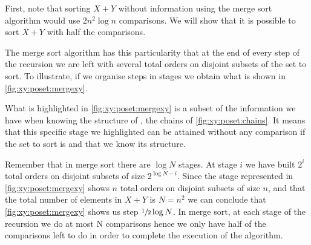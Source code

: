First, note that sorting $X + Y$ without information using the merge sort
algorithm would use $2 n^2 \log n$ comparisons. We will show that it is
possible to sort $X + Y$ with half the comparisons.

The merge sort algorithm has this particularity that at the end of every step
of the recursion we are left with several total orders on disjoint subsets of
the set to sort. To illustrate, if we organise steps in stages we obtain what
is shown in \ref{fig:xy:poset:mergexy}.

What is highlighted in \ref{fig:xy:poset:mergexy} is a subset of the
information we have when knowing the structure of \XY, \ie the chains of
\ref{fig:xy:poset:chains}. It means that this specific stage we
highlighted can be attained without any comparison if the set to sort is \XY
and that we know its structure.

Remember that in merge sort there are $\log N$ stages. At stage $i$ we have
built $2^{i}$ total orders on disjoint subsets of size $2^{\log N - i}$. Since
the stage represented in \ref{fig:xy:poset:mergexy} shows $n$ total orders on
disjoint subsets of size $n$, and that the total number of elements in $X+Y$ is
$N = n^2$ we can conclude that \ref{fig:xy:poset:mergexy} shows us step
$\sfrac{1}{2} \log N$. In merge sort, at each stage of the recursion we do at
most N comparisons hence we only have half of the comparisons left to do in
order to complete the execution of the algorithm.
